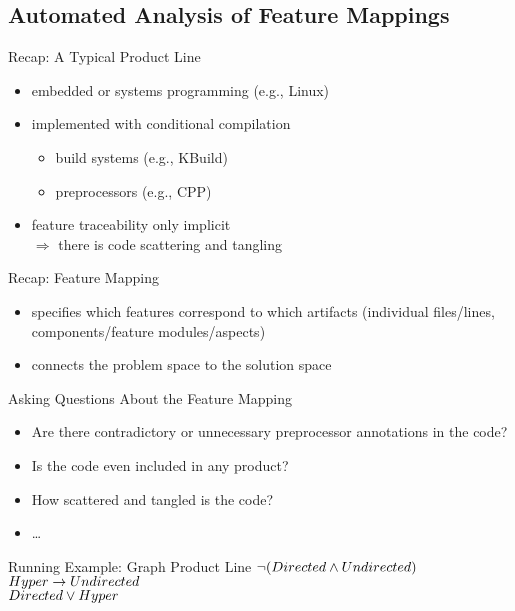 
\newcommand{\notleftright}{\mathrel{\ooalign{$\Leftrightarrow$\cr\hidewidth$/$\hidewidth}}}

\subsection{Automated Analysis of Feature Mappings}

\begin{frame}{\myframetitle}
	\begin{mycolumns}[widths={45,55}]
		\begin{note}{Recap: A Typical Product Line}
			\begin{itemize}
				\item embedded or systems programming (e.g., Linux)
				\item implemented with conditional compilation
				\begin{itemize}
					\item build systems (e.g., KBuild)
					\item preprocessors (e.g., CPP)
				\end{itemize}
				\item feature traceability only implicit\\
					$\Rightarrow$ there is code scattering and tangling
			\end{itemize}
		\end{note}
		\begin{definition}{Recap: Feature Mapping}
			\begin{itemize}
				\item specifies which features correspond to which artifacts (individual files/lines, components/feature modules/aspects)
				\item connects the problem space to the solution space
			\end{itemize}
		\end{definition}
		\mynextcolumn
		\begin{example}{Asking Questions About the Feature Mapping}
			\begin{itemize}
				\item Are there contradictory or unnecessary preprocessor annotations in the code?
				\item Is the code even included in any product?
				\item How scattered and tangled is the code?
				\item \ldots
			\end{itemize}
		\end{example}
		\begin{exampletight}{Running Example: Graph Product Line}
			\centering
			$\neg (Directed \wedge Undirected)$\\
			$Hyper \rightarrow Undirected$\\
			$Directed \vee Hyper$
		\end{exampletight}
	\end{mycolumns}
\end{frame}

